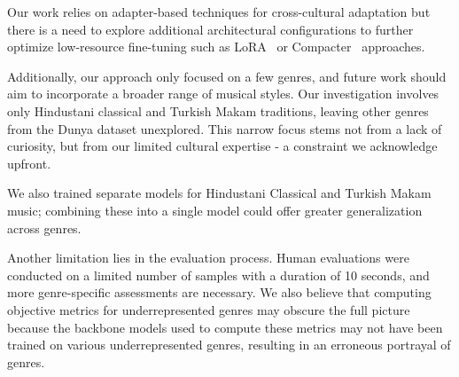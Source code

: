 Our work relies on adapter-based techniques for cross-cultural adaptation but there is a need to explore additional architectural configurations to further optimize low-resource fine-tuning such as LoRA~\cite{DBLP:journals/corr/abs-2106-09685} or Compacter~\cite{Davison2021CompacterEL} approaches. 

Additionally, our approach only focused on a few genres, and future work should aim to incorporate a broader range of musical styles. Our investigation involves only Hindustani classical and Turkish Makam traditions, leaving other genres from the Dunya dataset unexplored. This narrow focus stems not from a lack of curiosity, but from our limited cultural expertise - a constraint we acknowledge upfront.

We also trained separate models for Hindustani Classical and Turkish Makam music; combining these into a single model could offer greater generalization across genres. 

Another limitation lies in the evaluation process. Human evaluations were conducted on a limited number of samples with a duration of 10 seconds, and more genre-specific assessments are necessary. We also believe that computing objective metrics for underrepresented genres may obscure the full picture because the backbone models used to compute these metrics may not have been trained on various underrepresented genres, resulting in an erroneous portrayal of genres.
